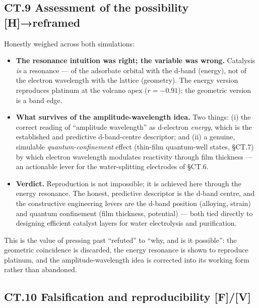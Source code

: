 \documentclass[
  10pt,
]{article}
\providecommand{\tightlist}{%
  \setlength{\itemsep}{0pt}\setlength{\parskip}{0pt}}
\begin{document}
\hypertarget{ct.9-assessment-of-the-possibility-hreframed}{%
\subsection{\texorpdfstring{CT.9 Assessment of the possibility
\textbf{{[}H{]}→reframed}}{CT.9 Assessment of the possibility {[}H{]}→reframed}}\label{ct.9-assessment-of-the-possibility-hreframed}}

Honestly weighed across both simulations:

\begin{itemize}
\tightlist
\item
  \textbf{The resonance intuition was right; the variable was wrong.}
  Catalysis \emph{is} a resonance --- of the adsorbate orbital with the
  d-band (energy), not of the electron wavelength with the lattice
  (geometry). The energy version reproduces platinum at the volcano apex
  (\(r=-0.91\)); the geometric version is a band edge.
\item
  \textbf{What survives of the amplitude-wavelength idea.} Two things:
  (i) the correct reading of ``amplitude wavelength'' as d-electron
  \emph{energy}, which is the established and predictive d-band-centre
  descriptor; and (ii) a genuine, simulable \emph{quantum-confinement}
  effect (thin-film quantum-well states, §CT.7) by which electron
  wavelength modulates reactivity through film thickness --- an
  actionable lever for the water-splitting electrodes of §CT.6.
\item
  \textbf{Verdict.} Reproduction is not impossible; it is achieved here
  through the energy resonance. The honest, predictive descriptor is the
  d-band centre, and the constructive engineering levers are the d-band
  position (alloying, strain) and quantum confinement (film thickness,
  potential) --- both tied directly to designing efficient catalyst
  layers for water electrolysis and purification.
\end{itemize}

This is the value of pressing past ``refuted'' to ``why, and is it
possible'': the geometric coincidence is discarded, the energy resonance
is shown to reproduce platinum, and the amplitude-wavelength idea is
corrected into its working form rather than abandoned.

\hypertarget{ct.10-falsification-and-reproducibility-fv}{%
\subsection{\texorpdfstring{CT.10 Falsification and reproducibility
\textbf{{[}F{]}/{[}V{]}}}{CT.10 Falsification and reproducibility {[}F{]}/{[}V{]}}}\label{ct.10-falsification-and-reproducibility-fv}}
\end{document}
